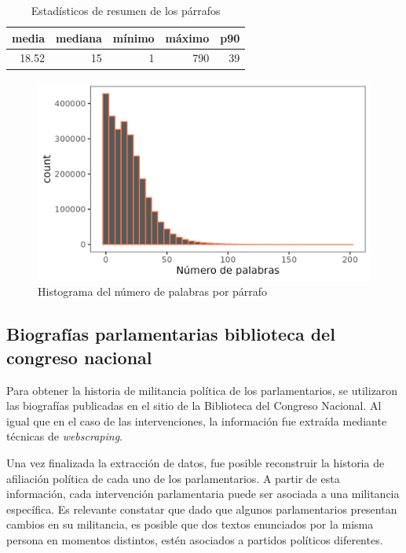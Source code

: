 \documentclass[
  12pt,
]{article}
\begin{document}
\begin{table}[H]

\caption{\label{tab:descripcion_parrafos}Estadísticos de resumen de los párrafos}
\centering
\begin{tabular}[t]{rrrrr}
\toprule
media & mediana & mínimo & máximo & p90\\
\midrule
18.52 & 15 & 1 & 790 & 39\\
\bottomrule
\end{tabular}
\end{table}

\begin{figure}[H]
\centering
\large
\caption{Histograma del número de palabras por párrafo}
\label{plot_descripcion_parrafos}
\includegraphics[width = 0.5 \textwidth]{cuadros_tesis/plot_hist_descripcion_parrafos.png}
\normalsize
\end{figure}

\hypertarget{biografuxedas-parlamentarias-biblioteca-del-congreso-nacional}{%
\subsection{Biografías parlamentarias biblioteca del congreso
nacional}\label{biografuxedas-parlamentarias-biblioteca-del-congreso-nacional}}

Para obtener la historia de militancia política de los parlamentarios,
se utilizaron las biografías publicadas en el sitio de la Biblioteca del
Congreso Nacional. Al igual que en el caso de las intervenciones, la
información fue extraída mediante técnicas de \emph{webscraping}.

Una vez finalizada la extracción de datos, fue posible reconstruir la
historia de afiliación política de cada uno de los parlamentarios. A
partir de esta información, cada intervención parlamentaria puede ser
asociada a una militancia específica. Es relevante constatar que dado
que algunos parlamentarios presentan cambios en su militancia, es
posible que dos textos enunciados por la misma persona en momentos
distintos, estén asociados a partidos políticos diferentes.
\end{document}
